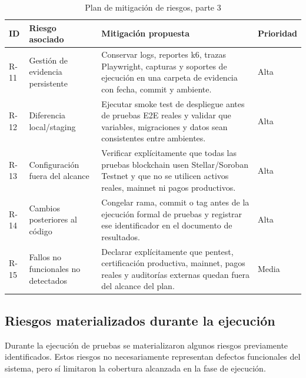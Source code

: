 \documentclass[12pt,letterpaper]{article}
\begin{document}
\begin{table}[H]
\centering
\begingroup
\scriptsize
\setlength{\tabcolsep}{2.5pt}
\renewcommand{\arraystretch}{1.18}

\begin{tabularx}{\textwidth}{|
>{\centering\arraybackslash}p{1.1cm}|
>{\raggedright\arraybackslash}p{3.5cm}|
>{\raggedright\arraybackslash}X|
>{\centering\arraybackslash}p{1.8cm}|}
\hline
\textbf{ID} & \textbf{Riesgo asociado} & \textbf{Mitigación propuesta} & \textbf{Prioridad} \\
\hline
R-11 & Gestión de evidencia persistente & Conservar logs, reportes k6, trazas Playwright, capturas y soportes de ejecución en una carpeta de evidencia con fecha, commit y ambiente. & Alta \\
\hline
R-12 & Diferencia local/staging & Ejecutar smoke test de despliegue antes de pruebas E2E reales y validar que variables, migraciones y datos sean consistentes entre ambientes. & Alta \\
\hline
R-13 & Configuración fuera del alcance & Verificar explícitamente que todas las pruebas blockchain usen Stellar/Soroban Testnet y que no se utilicen activos reales, mainnet ni pagos productivos. & Alta \\
\hline
R-14 & Cambios posteriores al código & Congelar rama, commit o tag antes de la ejecución formal de pruebas y registrar ese identificador en el documento de resultados. & Alta \\
\hline
R-15 & Fallos no funcionales no detectados & Declarar explícitamente que pentest, certificación productiva, mainnet, pagos reales y auditorías externas quedan fuera del alcance del plan. & Media \\
\hline
\end{tabularx}

\endgroup
\caption{Plan de mitigación de riesgos, parte 3}
\label{tab:mitigacion-riesgos-3}
\end{table}

\subsection{Riesgos materializados durante la ejecución}

Durante la ejecución de pruebas se materializaron algunos riesgos previamente identificados. Estos riesgos no necesariamente representan defectos funcionales del sistema, pero sí limitaron la cobertura alcanzada en la fase de ejecución.
\end{document}
